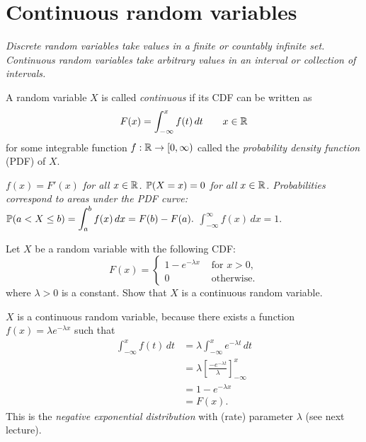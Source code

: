 \section{Continuous random variables}

\bit
\it Discrete random variables take values in a finite or countably infinite set.
\it Continuous random variables take arbitrary values in an interval or collection of intervals.
\eit

\begin{definition}
A random variable $X$ is called \emph{continuous} if its CDF can be written as 
\[
F(x) = \int_{-\infty}^x f(t)\,dt\qquad x\in\mathbb{R}
\]
for some integrable function $f:\mathbb{R}\to[0,\infty)$ called the \emph{probability density function} (PDF) of $X$.
\end{definition}

\begin{remark}
\ben
\it $f(x) = F'(x)$ for all $x\in\mathbb{R}$.
\it $\mathbb{P}(X=x)=0$ for all $x\in\mathbb{R}$.
\it Probabilities correspond to areas under the PDF curve: 
$
\mathbb{P}(a< X\leq b) = \displaystyle\int_a^b f(x)\,dx = F(b) - F(a).
$
\it $\displaystyle\int_{-\infty}^{\infty} f(x)\,dx = 1.$
\een
\end{remark}

\begin{example}\label{ex:cts_exp}
Let $X$ be a random variable with the following CDF:
\[
F(x) = \left\{\begin{array}{ll}
	1-e^{-\lambda x} & \text{ for } x>0, \\
	0				& \text{ otherwise.}
\end{array}\right.
\]
where $\lambda>0$ is a constant. Show that $X$ is a continuous random variable.
\end{example}
\begin{solution}
$X$ is a continuous random variable, because there exists a function $f(x) = \lambda e^{-\lambda x}$ such that
\begin{align*}
\int_{-\infty}^x f(t)\,dt 
	& = \lambda \int_{-\infty}^x e^{-\lambda t}\,dt \\
	& = \lambda\left[\frac{-e^{-\lambda t}}{\lambda}\right]_{-\infty}^x \\
	& = 1 - e^{-\lambda x} \\
	& = F(x).
\end{align*}
This is the \emph{negative exponential distribution} with (rate) parameter $\lambda$ (see next lecture).
\end{solution}

